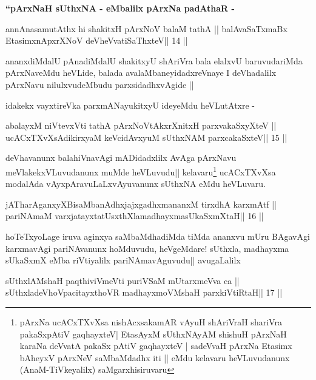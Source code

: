 \medskip
{\centerline{\textbf{``pArxNaH sUthxNA - eMbalilx pArxNa padAthaR -}}}

\begin{shl}
annAnasamutAthx hi shakitxH pArxNoV balaM tathA ||
balAvaSaTxmaBx EtasimxnApxrXNoV deVheV\s vatiSaThxteV\hfill || 14 ||
\end{shl}

\begin{artha}
ananxdiMdalU pAnadiMdalU shakitxyU shAriVra bala elalxvU baruvudariMda
pArxNaveMdu heVLide, balada avalaMbaneyidadxreVnaye I deVhadalilx
pArxNavu nilulxvudeMbudu parxsidadhxvAgide ||

idakekx vayxtireVka parxmANayukitxyU ideyeMdu heVLutAtxre -
\end{artha}

\begin{shl}
abalayxM niVtevxVti tathA pArxNoVtAkxrXnitxH parxvakaSxyXteV ||
ucACxTXvXsAdikirxyaM keVcidAvxyuM sUthxNAM parxcakaSxteV\hfill || 15 ||
\end{shl}

\begin{artha}
deVhavanunx balahiVnavAgi mADidadxlilx AvAga pArxNavu
meVlakekxVLuvudanunx muMde heVLuvudu|| kelavaru\footnote{pArxNa
  ucACxTXvXsa nishAcxsakamAR vAyuH shAriVraH shariVra pakaSxpAtiV
  gaqhayxteV| EtasAyxM sUthxNAyAM shishuH pArxNaH karaNa deVvatA
  pakaSx pAtiV gaqhayxteV | sadeVvaH pArxNa Etasimx bAheyxV pArxNeV
  saMbaMdadhx iti || eMdu kelavaru heVLuvudanunx (AnaM-TiVkeyalilx) saMgarxhisiruvaru} ucACxTXvXsa modalAda
vAyxpAravuLaLxvAyuvanunx sUthxNA eMdu heVLuvaru.
\end{artha}

\begin{shl}
jATharAganxyXBisaMbanAdhxjajxgadhxmananxM tirxdhA karxmAtf ||
pariNAmaM varxjatayxtatUsxthXlamadhayxmasUkaSxmXtaH\hfill || 16 ||
\end{shl}

\begin{artha}
hoTeTxyoLage iruva aginxya saMbaMdhadiMda tiMda ananxvu mUru BAgavAgi
karxmavAgi pariNAvanunx hoMduvudu, heVgeMdare! sUthxla, madhayxma
sUkaSxmX eMba riVtiyalilx pariNAmavAguvudu|| avugaLalilx
\end{artha}

\begin{shl}
sUthxlAMshaH paqthiviVmeVti puriVSaM mUtarxmeVva ca ||
sUthxladeVhoVpacitayxthoVR madhayxmoVM\s shaH parxkiVtiRtaH\hfill || 17 ||
\end{shl}

